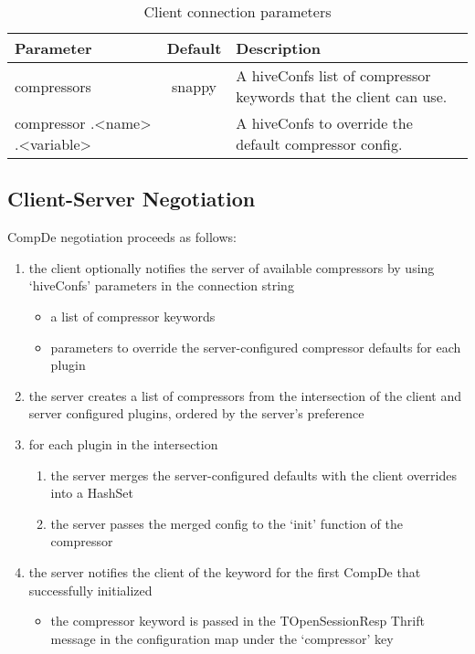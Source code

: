 \documentclass[11pt,a4paper]{article}
\begin{document}
		\begin{table}[H]
			\begin{tabular}{| p{3cm} | c | p{6.5cm} |} \hline
				
				\textbf{Parameter} & \textbf{Default} & \textbf{Description} \\ \hline
				compressors
				& snappy
				& A hiveConfs list of compressor keywords that the client can use. 
				\\ \hline
				
				compressor\linebreak
				.\textless name\textgreater\linebreak
				.\textless variable\textgreater
				&
				& A hiveConfs to override the default compressor config. 
				\\ \hline
				
			\end{tabular}
			\caption{Client connection parameters}
		\end{table}
		
	\subsection{Client-Server Negotiation}
		
		CompDe negotiation proceeds as follows:
		
		\begin{enumerate}
			
			\item the client optionally notifies the server of available compressors by using `hiveConfs' parameters in the connection string
			\begin{itemize}
				\item a list of compressor keywords
				\item parameters to override the server-configured compressor defaults for each plugin
			\end{itemize}
			
			\item the server creates a list of compressors from the intersection of the client and server configured plugins, ordered by the server's preference
			
			\item for each plugin in the intersection
			\begin{enumerate}[1.]
				\item the server merges the server-configured defaults with the client overrides into a HashSet
				\item the server passes the merged config to the `init' function of the compressor
			\end{enumerate}
			
			\item the server notifies the client of the keyword for the first CompDe that successfully initialized
			\begin{itemize}
				\item the compressor keyword is passed in the TOpenSessionResp Thrift message in the configuration map under the `compressor' key
			\end{itemize}
		\end{enumerate}
		
\end{document}
